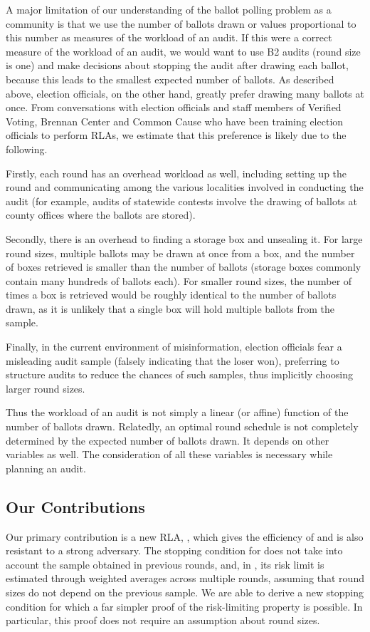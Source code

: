 A major limitation of our understanding of the ballot polling problem as a community is that we use the number of ballots drawn or values proportional to this number \cite{mclaughlin_thesis,bernhard-diss,RI-report} as measures of the workload of an audit. If this were a correct measure of the workload of an audit, we would want to use B2 audits (round size is one) and make decisions about stopping the audit after drawing each ballot, because this leads to the smallest expected number of ballots. As described above, election officials, on the other hand, greatly prefer drawing many ballots at once. From conversations with election officials and staff members of Verified Voting, Brennan Center and Common Cause who have been training election officials to perform RLAs, we estimate that this preference is likely due to the following. 
\begin{description}
\item Firstly, each round has an overhead workload as well, including setting up the round and communicating among the various localities involved in conducting the audit (for example, audits of statewide contests involve the drawing of ballots at county offices where the ballots are stored). 
\item Secondly, there is an overhead to finding a storage box and unsealing it. For large round sizes, multiple ballots may be drawn at once from a box, and the number of boxes retrieved is smaller than the number of ballots (storage boxes commonly contain many hundreds of ballots each). For smaller round sizes, the number of times a box is retrieved would be roughly identical to the number of ballots drawn, as it is unlikely that a single box will hold multiple ballots from the sample. 
\item Finally, in the current environment of misinformation, election officials fear a misleading audit sample (falsely indicating that the loser won), preferring to structure audits to reduce the chances of such samples, thus implicitly choosing larger round sizes. 
\end{description}
Thus the workload of an audit is not simply a linear (or affine) function of the number of ballots drawn. Relatedly, an optimal round schedule is not completely determined by the expected number of ballots drawn. It depends on other variables as well. The consideration of all these variables is necessary while planning an audit. 

\subsection{Our Contributions}
Our primary contribution is a new RLA, \Providence, which gives the efficiency of \Minerva and is also resistant to a strong adversary. The stopping condition for \Minerva does not take into account the sample obtained in previous rounds, and, in \cite{usenix_minerva}, its risk limit is estimated through weighted averages across multiple rounds, assuming that round sizes do not depend on the previous sample. We are able to derive a new stopping condition for which a far simpler proof of the risk-limiting property is possible. In particular, this proof does not require an assumption about round sizes. 

